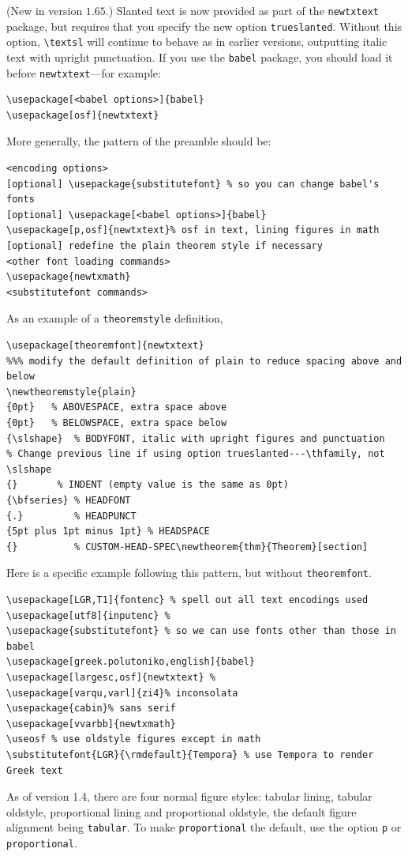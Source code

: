 \documentclass[\fsc]{article}
\theoremstyle{oldplain}
\theoremstyle{plain}
\begin{document}
(New in version $1.65$.) Slanted text is now provided as part of the {\tt newtxtext} package, but requires that you specify the new option {\tt trueslanted}. Without this option, \verb|\textsl| will continue to behave as in earlier versions, outputting italic text with upright punctuation.
If you use the {\tt babel} package, you should load it before {\tt newtxtext}---for example:
\begin{verbatim}
\usepackage[<babel options>]{babel}
\usepackage[osf]{newtxtext}
\end{verbatim}
More generally, the pattern of the preamble should be:
\begin{verbatim}
<encoding options>
[optional] \usepackage{substitutefont} % so you can change babel's fonts
[optional] \usepackage[<babel options>]{babel}
\usepackage[p,osf]{newtxtext}% osf in text, lining figures in math
[optional] redefine the plain theorem style if necessary
<other font loading commands>
\usepackage{newtxmath}
<substitutefont commands>
\end{verbatim}
As an example of a {\tt theoremstyle} definition,
\begin{verbatim}
\usepackage[theoremfont]{newtxtext}
%%% modify the default definition of plain to reduce spacing above and below
\newtheoremstyle{plain}
{0pt}   % ABOVESPACE, extra space above
{0pt}   % BELOWSPACE, extra space below
{\slshape}  % BODYFONT, italic with upright figures and punctuation
% Change previous line if using option trueslanted---\thfamily, not \slshape
{}       % INDENT (empty value is the same as 0pt)
{\bfseries} % HEADFONT
{.}         % HEADPUNCT
{5pt plus 1pt minus 1pt} % HEADSPACE
{}          % CUSTOM-HEAD-SPEC\newtheorem{thm}{Theorem}[section]
\end{verbatim}

Here is a specific example following this pattern, but without {\tt theoremfont}.
\begin{verbatim}
\usepackage[LGR,T1]{fontenc} % spell out all text encodings used
\usepackage[utf8]{inputenc} % 
\usepackage{substitutefont} % so we can use fonts other than those in babel
\usepackage[greek.polutoniko,english]{babel}
\usepackage[largesc,osf]{newtxtext} % 
\usepackage[varqu,varl]{zi4}% inconsolata
\usepackage{cabin}% sans serif
\usepackage[vvarbb]{newtxmath}
\useosf % use oldstyle figures except in math
\substitutefont{LGR}{\rmdefault}{Tempora} % use Tempora to render Greek text
\end{verbatim}

As of version 1.4, there are four normal figure styles: tabular lining, tabular oldstyle, proportional lining and proportional oldstyle, the default figure alignment being \texttt{tabular}. To make \texttt{proportional} the default, use the option \texttt{p} or \texttt{proportional}.
\end{document}
